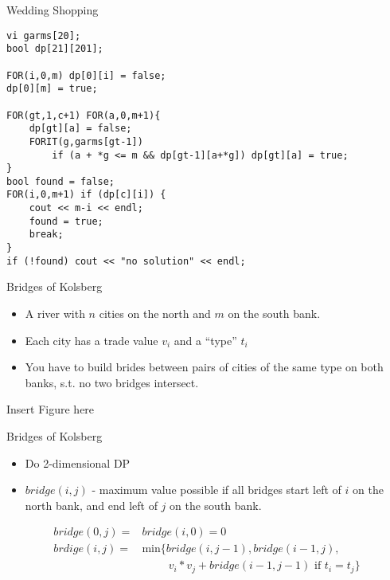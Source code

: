 \documentclass[12pt,t]{beamer}
\newcommand{\bi}{\begin{itemize}}
\newcommand{\ei}{\end{itemize}}
\begin{document}
\begin{frame}[fragile]{Wedding Shopping}
    \begin{verbatim}
vi garms[20];
bool dp[21][201];

FOR(i,0,m) dp[0][i] = false;
dp[0][m] = true;
	
FOR(gt,1,c+1) FOR(a,0,m+1){
    dp[gt][a] = false;
    FORIT(g,garms[gt-1])
        if (a + *g <= m && dp[gt-1][a+*g]) dp[gt][a] = true;
}
bool found = false;
FOR(i,0,m+1) if (dp[c][i]) {
    cout << m-i << endl;
    found = true;
    break;
}
if (!found) cout << "no solution" << endl;
    \end{verbatim}
\end{frame}


\begin{frame}{Bridges of Kolsberg}
	\bi
		\item A river with $n$ cities on the north and $m$ on the south bank.
		\item Each city has a trade value $v_i$ and a ``type'' $t_i$
		\item You have to build brides between pairs of cities of the same type on both banks, s.t. no two bridges intersect.
	\ei
	\begin{center} Insert Figure here \end{center}
\end{frame}


\begin{frame}{Bridges of Kolsberg}
	\bi
		\item Do 2-dimensional DP
		\item<2-> $bridge(i,j)$ - maximum value possible if all bridges start left of $i$ on the north bank, and end left of $j$ on the south bank.
	\ei
	
	\begin{align*}
		bridge(0,j) = &bridge(i,0) = 0\\
		brdige(i,j) = &\mathrm{min} \{bridge(i,j-1), bridge(i-1,j),\\
						&\hspace{1cm} v_i*v_j + bridge(i-1,j-1) \text{ if } t_i = t_j\}\\
	\end{align*}
\end{frame}
\end{document}
